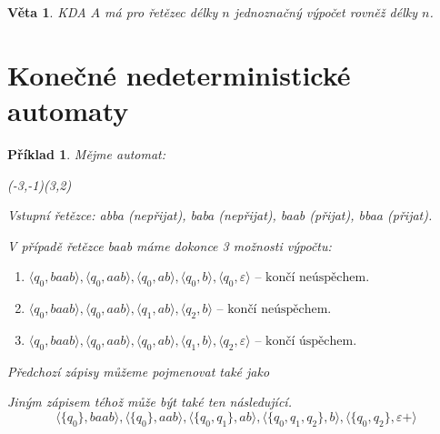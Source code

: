 \documentclass[10pt, a4paper, titlepage]{article}
\theoremstyle{note}
\newtheorem{veta}{Věta}
\newtheorem{priklad}{Příklad}
\begin{document}
\begin{veta}
KDA $A$ má pro řetězec délky $n$ jednoznačný výpočet rovněž délky $n$.
\end{veta}


\section{Konečné nedeterministické automaty}

\begin{priklad}
Mějme automat:

\vspace*{40px}
\begin{center}
\begin{VCPicture}{(-3,-1)(3,2)}

\end{VCPicture}
\end{center}

Vstupní řetězce: \textit{abba} (nepřijat), \textit{baba} (nepřijat), \textit{baab} (přijat), \textit{bbaa} (přijat).

V případě řetězce \textit{baab} máme dokonce 3 možnosti výpočtu:
\begin{enumerate}
\item
$\langle q_{0}, baab \rangle, \langle q_{0}, aab \rangle, \langle q_{0}, ab \rangle, \langle q_{0}, b \rangle, \langle q_{0}, \varepsilon \rangle \text{ -- končí neúspěchem.}$
\item
$\langle q_{0}, baab \rangle, \langle q_{0}, aab \rangle, \langle q_{1}, ab \rangle, \langle q_{2}, b \rangle \text{ -- končí neúspěchem.}$
\item
$\langle q_{0}, baab \rangle, \langle q_{0}, aab \rangle, \langle q_{0}, ab \rangle, \langle q_{1}, b \rangle, \langle q_{2}, \varepsilon \rangle \text{ -- končí úspěchem.}$ 
\end{enumerate}
Předchozí zápisy můžeme pojmenovat také jako 

Jiným zápisem téhož může být také ten následující.
$$
\langle \lbrace q_{0} \rbrace, baab \rangle, \langle \lbrace q_{0} \rbrace, aab \rangle, \langle \lbrace q_{0}, q_{1} \rbrace, ab \rangle,
\langle \lbrace q_{0}, q_{1}, q_{2} \rbrace, b \rangle, \langle \lbrace q_{0}, q_{2} \rbrace, \varepsilon+ \rangle
$$ 
\end{priklad}
\end{document}
